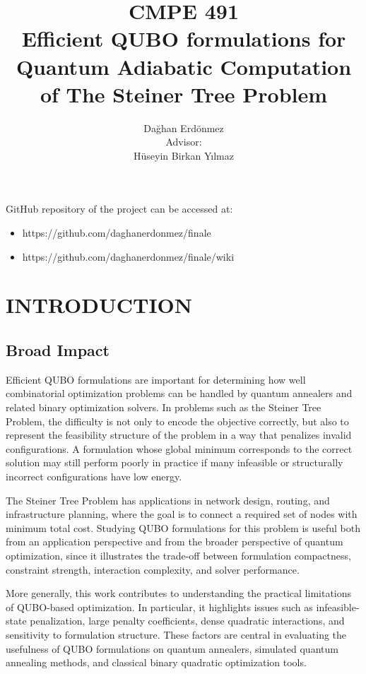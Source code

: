 \documentclass[a4paper,12pt]{report}
\begin{document}
\title{CMPE 491 \\ Efficient QUBO formulations for Quantum Adiabatic Computation of The Steiner Tree Problem}
\author{
Dağhan Erdönmez \\
Advisor: \\ 
Hüseyin Birkan Yılmaz
}
\date{}
\maketitle{}

GitHub repository of the project can be accessed at: 
\begin{itemize}
    \item https://github.com/daghanerdonmez/finale
    \item https://github.com/daghanerdonmez/finale/wiki
\end{itemize}
\tableofcontents

\chapter{INTRODUCTION}

\section{Broad Impact}

Efficient QUBO formulations are important for determining how well combinatorial optimization problems can be handled by quantum annealers and related binary optimization solvers. In problems such as the Steiner Tree Problem, the difficulty is not only to encode the objective correctly, but also to represent the feasibility structure of the problem in a way that penalizes invalid configurations. A formulation whose global minimum corresponds to the correct solution may still perform poorly in practice if many infeasible or structurally incorrect configurations have low energy.

The Steiner Tree Problem has applications in network design, routing, and infrastructure planning, where the goal is to connect a required set of nodes with minimum total cost. Studying QUBO formulations for this problem is useful both from an application perspective and from the broader perspective of quantum optimization, since it illustrates the trade-off between formulation compactness, constraint strength, interaction complexity, and solver performance.

More generally, this work contributes to understanding the practical limitations of QUBO-based optimization. In particular, it highlights issues such as infeasible-state penalization, large penalty coefficients, dense quadratic interactions, and sensitivity to formulation structure. These factors are central in evaluating the usefulness of QUBO formulations on quantum annealers, simulated quantum annealing methods, and classical binary quadratic optimization tools.
\end{document}
